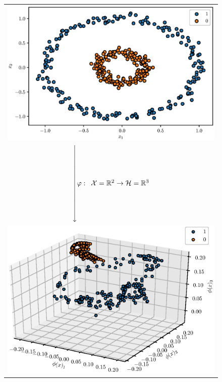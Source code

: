 \begin{figure}
    \centering
    \begin{tabular}{c}
        \includegraphics[valign=m, width=.5\textheight]{./gfx/input.eps} \\
        $\xdownarrow{2cm} \phi: \enskip \mathcal{X} = \mathbb{R}^2 \to
        \mathcal{H} = \mathbb{R}^3$ \\
        \includegraphics[valign=m, width=.5\textheight]{./gfx/feature.eps}

\end{tabular}
\end{figure}
